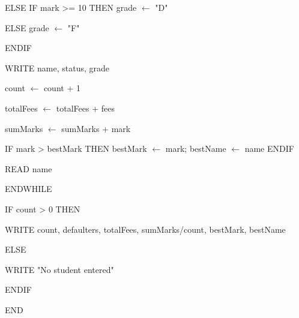 \documentclass[11pt]{article}
\begin{document}
\begin{exemplebox}
\begin{ttfamily}
\hspace*{1em}ELSE IF mark >= 10 THEN grade $\leftarrow$ "D"\par
\hspace*{1em}ELSE grade $\leftarrow$ "F"\par
\hspace*{1em}ENDIF\par
\hspace*{1em}WRITE name, status, grade\par
\hspace*{1em}count $\leftarrow$ count + 1\par
\hspace*{1em}totalFees $\leftarrow$ totalFees + fees\par
\hspace*{1em}sumMarks $\leftarrow$ sumMarks + mark\par
\hspace*{1em}IF mark > bestMark THEN bestMark $\leftarrow$ mark; bestName $\leftarrow$ name ENDIF\par
\hspace*{1em}READ name\par
ENDWHILE\par
IF count > 0 THEN\par
\hspace*{1em}WRITE count, defaulters, totalFees, sumMarks/count, bestMark, bestName\par
ELSE\par
\hspace*{1em}WRITE "No student entered"\par
ENDIF\par
END
\end{ttfamily}
\end{exemplebox}
\end{document}
